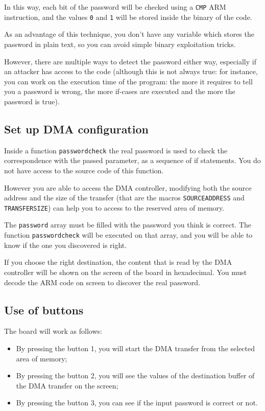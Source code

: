 \documentclass[a4paper]{article}
\begin{document}
In this way, each bit of the password will be checked using a \texttt{CMP} ARM instruction, and the values \texttt{0} and \texttt{1} will be stored inside the binary of the code. 

As an advantage of this technique, you don't have any variable which stores the password in plain text, so you can avoid simple binary exploitation tricks. 

However, there are multiple ways to detect the password either way, especially if an attacker has access to the code (although this is not always true: for instance, you can work on the execution time of the program: the more it requires to tell you a password is wrong, the more if-cases are executed and the more the password is true). 
\\

\subsection{Set up DMA configuration}
Inside a function \texttt{passwordcheck} the real password is used to check the correspondence with the passed parameter, as a sequence of if statements.
You do not have access to the source code of this function. 

However you are able to access the DMA controller, modifying both the source address and the size of the transfer (that are the macros \texttt{SOURCEADDRESS} and \texttt{TRANSFERSIZE}) can help you to access to the reserved area of memory. 

The \texttt{password} array must be filled with the password you think is correct. The function \texttt{passwordcheck} will be executed on that array, and you will be able to know if the one you discovered is right. 

If you choose the right destination, the content that is read by the DMA controller will be shown on the screen of the board in hexadecimal.
You must decode the ARM code on screen to discover the real password. 

\subsection{Use of buttons}
The board will work as follows: 
\begin{itemize}
    \item By pressing the button 1, you will start the DMA transfer from the selected area of memory;
    \item By pressing the button 2, you will see the values of the destination buffer of the DMA transfer on the screen;
    \item By pressing the button 3, you can see if the input password is correct or not. 
\end{itemize}
\end{document}
